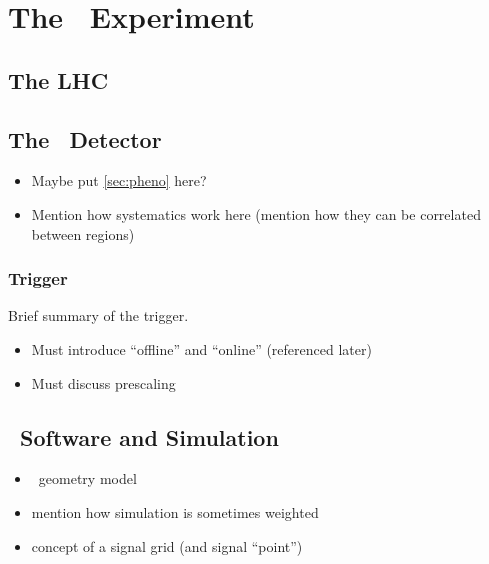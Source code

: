 \chapter{The \atlas\ Experiment}
\section{The LHC}
\label{sec:lhc}
\section{The \atlas\ Detector}
\begin{itemize}
\item Maybe put \cref{sec:pheno} here?
\item Mention how systematics work here (mention how they can be correlated between regions)
\end{itemize}
\subsection{Trigger}
\label{sec:trigger}
Brief summary of the trigger.
\begin{itemize}
\item Must introduce ``offline'' and ``online'' (referenced later)
\item Must discuss prescaling
\end{itemize}
\section{\atlas\ Software and Simulation}
\label{sec:software}
\begin{itemize}
\item \atlas\ geometry model
\item mention how simulation is sometimes weighted
\item concept of a signal grid (and signal ``point'')
\end{itemize}
